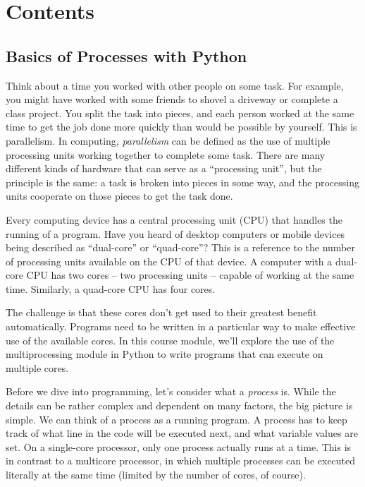 \documentclass[letterpaper,10pt,openany,oneside]{sphinxmanual}
\begin{document}
\chapter{Contents}
\label{index:contents}

\section{Basics of Processes with Python}
\label{ProcessesBasics::doc}\label{ProcessesBasics:basics-of-processes-with-python}
Think about a time you worked with other people on some task. For
example, you might have worked with some friends to shovel a driveway or
complete a class project. You split the task into pieces, and each
person worked at the same time to get the job done more quickly than
would be possible by yourself. This is parallelism. In computing,
\emph{parallelism} can be defined as the use of multiple processing units
working together to complete some task. There are many different kinds
of hardware that can serve as a “processing unit”, but the principle is
the same: a task is broken into pieces in some way, and the processing
units cooperate on those pieces to get the task done.

Every computing device has a central processing unit (CPU) that handles
the running of a program. Have you heard of desktop computers or mobile
devices being described as “dual-core” or “quad-core”? This is a
reference to the number of processing units available on the CPU of that
device. A computer with a dual-core CPU has two cores – two processing
units – capable of working at the same time. Similarly, a quad-core CPU
has four cores.

The challenge is that these cores don’t get used to their greatest
benefit automatically. Programs need to be written in a particular way
to make effective use of the available cores. In this course module,
we’ll explore the use of the multiprocessing module in Python to write
programs that can execute on multiple cores.

Before we dive into programming, let’s consider what a \emph{process} is.
While the details can be rather complex and dependent on many factors,
the big picture is simple. We can think of a process as a running
program. A process has to keep track of what line in the code will be
executed next, and what variable values are set. On a single-core
processor, only one process actually runs at a time. This is in contrast
to a multicore processor, in which multiple processes can be executed
literally at the same time (limited by the number of cores, of course).
\end{document}
